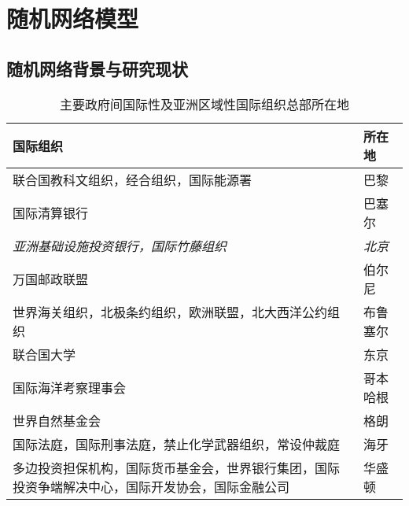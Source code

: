 \chapter{随机网络模型}\label{chapter1}
\section{随机网络背景与研究现状}
\Blindtext
\begin{table}
    \centering
    \caption{\label{ingo}主要政府间国际性及亚洲区域性国际组织总部所在地}
    \begin{tabular}{p{11cm}<{\raggedright}p{2cm}<{\raggedright}}
    \toprule
    \textbf{国际组织}                                                                                     & \textbf{所在地} \\ \midrule
    联合国教科文组织，经合组织，国际能源署                                                                               & 巴黎           \\
    国际清算银行                                                                                            & 巴塞尔          \\
    \textit{亚洲基础设施投资银行，国际竹藤组织}                                                                        & \textit{北京}  \\
    万国邮政联盟                                                                                            & 伯尔尼          \\
    世界海关组织，北极条约组织，欧洲联盟，北大西洋公约组织                                                                       & 布鲁塞尔         \\
    联合国大学                                                                                             & 东京           \\
    国际海洋考察理事会                                                                                         & 哥本哈根         \\
    世界自然基金会                                                                                           & 格朗           \\
    国际法庭，国际刑事法庭，禁止化学武器组织，常设仲裁庭                                                                        & 海牙           \\
    多边投资担保机构，国际货币基金会，世界银行集团，国际投资争端解决中心，国际开发协会，国际金融公司                                                  & 华盛顿          \\

\end{tabular}
\end{table}
